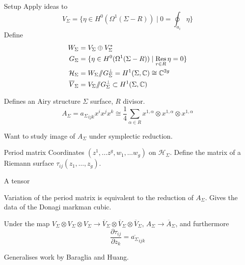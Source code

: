 \frame{\sectionpage}

\begin{frame}{Setup}
Apply ideas to 
\[V_\Sigma =\{ \eta\in H^0(\Omega^1(\Sigma-R)) \mid 0=\oint_{a_i}\eta\}\]
Define 
\begin{align*} 
W_\Sigma &= V_\Sigma \oplus V_\Sigma^* \\ 
G_\Sigma &= \{ \eta\in H^0(\Omega^1(\Sigma-R)) \mid\operatorname*{Res}_{r\in R}\eta=0\} \\
\mathcal{H}_\Sigma &= W_\Sigma /\!\!/G_\Sigma^{\perp} = H^1(\Sigma, \mathbb{C}) \cong \mathbb{C}^{2g}\\
\overline{V}_\Sigma &= V_\Sigma  /\!\!/G_\Sigma^{\perp} \subset  H^1(\Sigma, \mathbb{C})
\end{align*}

\end{frame}


\begin{frame}{Defines an Airy structure}
\(\Sigma\) surface, \(R\) divisor.
\[ A_\Sigma = {a_{\Sigma}}_{ijk} x^i x^j x^k  \cong \frac{1}{4} \sum_{\alpha \in R} x^{1,\alpha} \otimes x^{1,\alpha} \otimes x^{1,\alpha}   \]

Want to study image of \(A_\Sigma\) under symplectic reduction.
\end{frame}



\begin{frame}{Period matrix}
Coordinates \((z^1,\dots z^g, w_1, \dots w_g )\) on \(\mathcal{H}_\Sigma\).
\vspace{1em}
Define the  matrix of a Riemann surface \( \tau_{ij}(z_1, \dots, z_g)\).

\end{frame}

\begin{frame}{A tensor} 

Variation of the period matrix is equivalent to the reduction of \( A_\Sigma\). Gives the data of the Donagi markman cubic.
\begin{thm}
Under the map
\(V_\Sigma \otimes V_\Sigma \otimes V_\Sigma \rightarrow \overline{V}_\Sigma \otimes \overline{V}_\Sigma \otimes \overline{V}_\Sigma\),
\( A_\Sigma \rightarrow \overline{A}_\Sigma\), and furthermore
\[ \frac{\partial \tau_{ij}}{\partial z_k} = \overline{{a_\Sigma}}_{ijk}\]
\end{thm}

Generalises work by Baraglia and Huang.
\end{frame}


